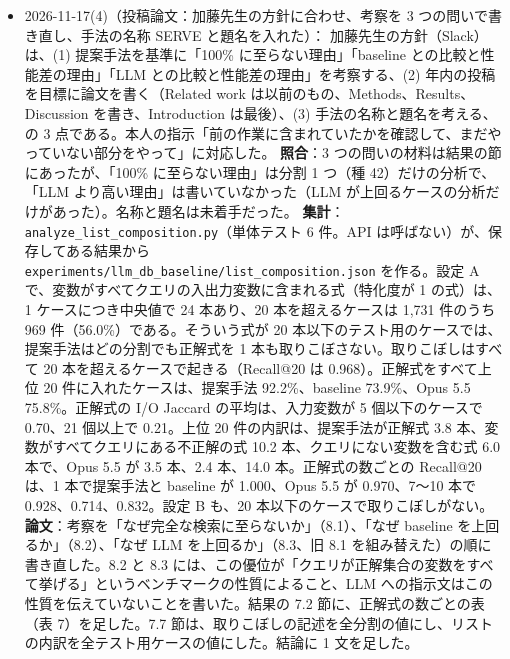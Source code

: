 \documentclass[11pt,a4paper]{jsarticle}
\begin{document}
\begin{itemize}[nosep]
    \textbf{修士論文の決まり（本人から）}：本文は 40 ページ以下で、付録は数えず、いくら書いてもよい。図表は必要なだけ使う。書き方は論文と同じでよい（筋を練り、途中の試行錯誤には触れず、結論とそれを支える結果を書く）。今の修論は全 72 ページで、本文は約 25 ページである。修論の本文を論文の今の内容にそろえる作業は、まだしていない。
    \textbf{確認}：論文は \texttt{latexmk} が exit 0 で 76 ページ、本文 10,307 語、Abstract 248 語、原稿の点検は合格。全テストは 862 passed、3 skipped、1 failed（\texttt{tests/test\_fig\_overview.py}。この作業と関係のない、前からの失敗）。
  \item 2026-11-17(4)（投稿論文：加藤先生の方針に合わせ、考察を 3 つの問いで書き直し、手法の名称 SERVE と題名を入れた）：
    加藤先生の方針（Slack）は、(1) 提案手法を基準に「100\% に至らない理由」「baseline との比較と性能差の理由」「LLM との比較と性能差の理由」を考察する、(2) 年内の投稿を目標に論文を書く（Related work は以前のもの、Methods、Results、Discussion を書き、Introduction は最後）、(3) 手法の名称と題名を考える、の 3 点である。本人の指示「前の作業に含まれていたかを確認して、まだやっていない部分をやって」に対応した。
    \textbf{照合}：3 つの問いの材料は結果の節にあったが、「100\% に至らない理由」は分割 1 つ（種 42）だけの分析で、「LLM より高い理由」は書いていなかった（LLM が上回るケースの分析だけがあった）。名称と題名は未着手だった。
    \textbf{集計}：\texttt{analyze\_list\_composition.py}（単体テスト 6 件。API は呼ばない）が、保存してある結果から \texttt{experiments/llm\_db\_baseline/list\_composition.json} を作る。設定 A で、変数がすべてクエリの入出力変数に含まれる式（特化度が 1 の式）は、1 ケースにつき中央値で 24 本あり、20 本を超えるケースは 1,731 件のうち 969 件（56.0\%）である。そういう式が 20 本以下のテスト用のケースでは、提案手法はどの分割でも正解式を 1 本も取りこぼさない。取りこぼしはすべて 20 本を超えるケースで起きる（Recall@20 は 0.968）。正解式をすべて上位 20 件に入れたケースは、提案手法 92.2\%、baseline 73.9\%、Opus 5.5 75.8\%。正解式の I/O Jaccard の平均は、入力変数が 5 個以下のケースで 0.70、21 個以上で 0.21。上位 20 件の内訳は、提案手法が正解式 3.8 本、変数がすべてクエリにある不正解の式 10.2 本、クエリにない変数を含む式 6.0 本で、Opus 5.5 が 3.5 本、2.4 本、14.0 本。正解式の数ごとの Recall@20 は、1 本で提案手法と baseline が 1.000、Opus 5.5 が 0.970、7〜10 本で 0.928、0.714、0.832。設定 B も、20 本以下のケースで取りこぼしがない。
    \textbf{論文}：考察を「なぜ完全な検索に至らないか」（8.1）、「なぜ baseline を上回るか」（8.2）、「なぜ LLM を上回るか」（8.3、旧 8.1 を組み替えた）の順に書き直した。8.2 と 8.3 には、この優位が「クエリが正解集合の変数をすべて挙げる」というベンチマークの性質によること、LLM への指示文はこの性質を伝えていないことを書いた。結果の 7.2 節に、正解式の数ごとの表（表 7）を足した。7.7 節は、取りこぼしの記述を全分割の値にし、リストの内訳を全テスト用ケースの値にした。結論に 1 文を足した。

\end{itemize}
\end{document}
